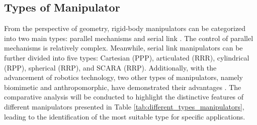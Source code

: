\subsection{Types of Manipulator }
From the perspective of geometry, rigid-body manipulators can be categorized into two main types: parallel 
mechanisms and serial link \cite{MECH0089book}. The control of parallel mechanisms is relatively complex. 
Meanwhile, serial link manipulators can be further divided into five types: Cartesian (PPP), articulated (RRR), 
cylindrical (RPP), spherical (RRP), and SCARA (RRP). Additionally, with the advancement of robotics technology, 
two other types of manipulators, namely biomimetic and anthropomorphic, have demonstrated their advantages 
\cite{manipulators_types1,manipulators_types2}.
The comparative analysis will be conducted to highlight the distinctive features of different manipulators 
presented in Table \ref{tab:different_types_manipulators}, leading to the identification of the most suitable 
type for specific applications.
